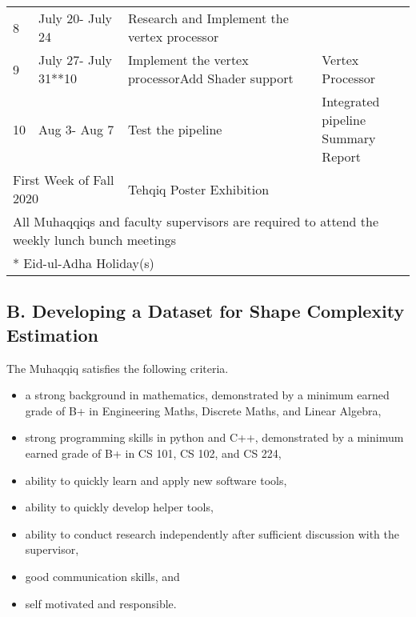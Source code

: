 \documentclass{article}
\begin{document}
\begin{tabularx}{\textwidth}{|*{2}{l|}X|l|}
  8                                            & July 20- July 24                               & Research and Implement the vertex processor                                                                                                                 &                                    \\
  9                                            & July 27- July 31**10                           & Implement the vertex processor\newline Add Shader support                                                                                                   & Vertex Processor                   \\\hline
  10                                           & Aug 3- Aug 7                                   & Test the pipeline                                                                                                                                           & \shortstack[l]{Integrated pipeline \\ Summary Report}\\\hline
  \multicolumn{2}{|l}{First Week of Fall 2020} & \multicolumn{2}{|l|}{Tehqiq Poster Exhibition}                                                                                                                                                                                                    \\\hline
  \multicolumn{4}{l}{\footnotesize * All Muhaqqiqs and faculty supervisors are required to attend the weekly lunch bunch meetings}                                                                                                                                                                 \\
  \multicolumn{4}{l}{\footnotesize ** Eid-ul-Adha Holiday(s)}
\end{tabularx}

\subsection*{B. Developing a Dataset for Shape Complexity Estimation}
The Muhaqqiq satisfies the following criteria.
\begin{itemize}
  \item a strong background in mathematics, demonstrated by a minimum earned grade of B+ in Engineering Maths, Discrete Maths, and Linear Algebra,
  \item strong programming skills in python and C++, demonstrated by a minimum earned grade of B+ in CS 101, CS 102, and CS 224,
  \item ability to quickly learn and apply new software tools,
  \item ability to quickly develop helper tools,
  \item ability to conduct research independently after sufficient discussion with the supervisor,
  \item good communication skills, and
  \item self motivated and responsible.
\end{itemize}
\end{document}
